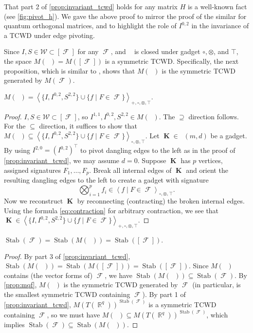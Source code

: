 \documentclass{theoretics}
\DeclareMathOperator{\rr}{\mathbb{R}}
\DeclareMathOperator{\vk}{\mathbf{K}}
\DeclareMathOperator{\fc}{\mathcal{F}}
\DeclareMathOperator{\gk}{\mathfrak{G}_{\mathcal{F}}}
\DeclareMathOperator{\qk}{\mathfrak{Q}_{\mathcal{F}}}
\DeclareMathOperator{\stab}{Stab}
\newcommand{\tcwd}[1]{\left\langle #1 \right\rangle_{+, \circ, \otimes ,\top}}
\newcommand{\tcwdn}[1]{\left\langle #1 \right\rangle_{\circ, \otimes ,\top}}
\begin{document}
That part 2 of \autoref{prop:invariant_tcwd} holds for any matrix $H$
is a well-known fact (see \autoref{fig:pivot_h}). We gave the above
proof to mirror the proof of the similar \cite[Lemma 6]{cai_planar_2023} for quantum
orthogonal matrices, and to highlight the role of $I^{0,2}$ 
in the invariance of a TCWD under edge pivoting.

Since $I,S \in \mathcal{W} \subset [\fc]$ for any $\fc$, and $\gk$ is closed under gadget 
$\circ,\otimes$, and $\top$, the space $M(\qk) = M([\fc])$ is a symmetric TCWD. Specifically,
the next proposition, which is similar to \cite[Theorem 3]{young2022equality}, shows that $M(\qk)$ is the symmetric TCWD generated by $M(\fc)$.
\begin{proposition}
    $M(\qk) = \tcwd{\big\{I,I^{0,2},S^{2,2}\big\} \cup \big\{f \mid F \in \fc\big\}}$.
    \label{prop:mqf}
\end{proposition}
\begin{proof}
    $I, S\in \mathcal{W} \subset [\fc]$, so $I^{1,1},I^{0,2},S^{2,2} \in M(\qk)$.
    The $\supseteq$ direction follows. For the $\subseteq$ direction, it suffices to show
    that $M(\gk) \subseteq \tcwdn{\big\{I,I^{0,2},S^{2,2}\big\} \cup \big\{f \mid F \in \fc\big\}}$.
    Let $\vk \in \gk(m,d)$ be a gadget. By using $I^{2,0} = (I^{0,2})^\top$ to pivot dangling edges to the
    left as in the proof of \autoref{prop:invariant_tcwd}, we may assume $d = 0$.
    Suppose $\vk$ has $p$ vertices, assigned signatures $F_1,\ldots,F_{p}$.
    Break all internal edges of $\vk$ and orient the resulting dangling edges to the left 
    to create a gadget with signature
    \begin{equation}
        \bigotimes_{i=1}^{p} f_i \in \tcwdn{f \mid F \in \fc}.
        \label{eq:biggadget}
    \end{equation}
    Now we reconstruct $\vk$ by reconnecting (contracting) the broken internal edges. 
    Using the formula \eqref{eq:contraction} for arbitrary contraction, we see that
    $\vk \in \tcwd{\big\{I,I^{0,2},S^{2,2}\big\} \cup \big\{f \mid F \in \fc\big\}}$.
\end{proof}

\begin{proposition}
    \label{prop:stabfc}
    $\stab(\fc) = \stab(M(\qk)) = \stab([\fc])$.
\end{proposition}
\begin{proof}
    By part 3 of \autoref{prop:invariant_tcwd}, $\stab(M(\qk)) = \stab(M([\fc])) = \stab([\fc])$.
    Since $M(\qk)$ contains (the vector forms of) $\fc$, we have
    $\stab(M(\qk)) \subseteq \stab(\fc)$. By \autoref{prop:mqf}, 
    $M(\qk)$ is the symmetric TCWD generated by $\fc$ (in particular, is the smallest symmetric
    TCWD containing $\fc$).
    By part 1 of \autoref{prop:invariant_tcwd}, $M(T(\rr^q))^{\stab(\fc)}$ is a symmetric TCWD
    containing $\fc$, so we must have $M(\qk) \subseteq M(T(\rr^q))^{\stab(\fc)}$, which implies
    $\stab(\fc) \subseteq \stab(M(\qk))$.
\end{proof}
\end{document}
